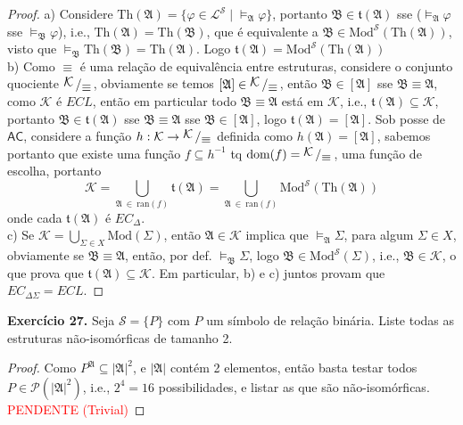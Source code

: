 \documentclass[11pt]{article}
\newcommand{\mc}[1]{\mathcal{#1}}
\newcommand{\mf}[1]{\mathfrak{#1}}
\newcommand{\msf}[1]{\mathsf{#1}}
\newcommand{\bigslant}[2]{{\raisebox{.2em}{$#1$}\left/\raisebox{-.2em}{$#2$}\right.}}
\begin{document}
\begin{proof}
    a) Considere $\text{Th}(\mf{A})=\{\varphi\in\mc{L}^\mc{S}\mid\vDash_\mf{A}\varphi\}$, portanto $\mf{B}\in\mf{t}(\mf{A})$ sse ($\vDash_\mf{A}\varphi$ sse $\vDash_\mf{B}\varphi$), i.e., $\text{Th}(\mf{A})=\text{Th}(\mf{B})$, que é equivalente a $\mf{B}\in\text{Mod}^\mc{S}\left(\text{Th}(\mf{A})\right)$, visto que $\vDash_\mf{B}\text{Th}(\mf{B})=\text{Th}(\mf{A})$. Logo $\mf{t}(\mf{A})=\text{Mod}^\mc{S}\left(\text{Th}(\mf{A})\right)$\\
    b) Como $\equiv$ é uma relação de equivalência entre estruturas, considere o conjunto quociente $\bigslant{\mc{K}}{\equiv}$, obviamente se temos $[\mf{A}]\in\bigslant{\mc{K}}{\equiv}$, então $\mf{B}\in[\mf{A}]$ sse $\mf{B}\equiv\mf{A}$, como $\mc{K}$ é $ECL$, então em particular todo $\mf{B}\equiv\mf{A}$ está em $\mc{K}$, i.e., $\mf{t}(\mf{A})\subseteq\mc{K}$, portanto $\mf{B}\in\mf{t}(\mf{A})$ sse $\mf{B}\equiv\mf{A}$ sse $\mf{B}\in[\mf{A}]$, logo $\mf{t}(\mf{A})=[\mf{A}]$. Sob posse de $\msf{AC}$, considere a função $h:\mc{K}\to\bigslant{\mc{K}}{\equiv}$ definida como $h(\mf{A})=[\mf{A}]$, sabemos portanto que existe uma função $f\subseteq h^{-1}$ tq $\text{dom}(f)=\bigslant{\mc{K}}{\equiv}$, uma função de escolha, portanto
    $$\mc{K}=\bigcup_{\mf{A}~\in~\text{ran}(f)}\mf{t}(\mf{A})=\bigcup_{\mf{A}~\in~\text{ran}(f)}\text{Mod}^\mc{S}\left(\text{Th}(\mf{A})\right)$$
    onde cada $\mf{t}(\mf{A})$ é $EC_\Delta$.\\
    c) Se $\mc{K}=\bigcup_{\Sigma\in X}\text{Mod}(\Sigma)$, então $\mf{A}\in\mc{K}$ implica que $\vDash_\mf{A}\Sigma$, para algum $\Sigma\in X$, obviamente se $\mf{B}\equiv\mf{A}$, então, por def. $\vDash_\mf{B}\Sigma$, logo $\mf{B}\in\text{Mod}^\mc{S}(\Sigma)$, i.e., $\mf{B}\in\mc{K}$, o que prova que $\mf{t}(\mf{A})\subseteq\mc{K}$. Em particular, b) e c) juntos provam que $EC_{\Delta\Sigma}=ECL$.
\end{proof}

\begin{shaded}
\textbf{Exercício 27.} Seja $\mc{S}=\{P\}$ com $P$ um símbolo de relação binária. Liste todas as estruturas não-isomórficas de tamanho 2.
\end{shaded}

\begin{proof}
    Como $P^\mf{A}\subseteq|\mf{A}|^2$, e $|\mf{A}|$ contém 2 elementos, então basta testar todos $P\in\mathcal{P}(|\mf{A}|^2)$, i.e., $2^4=16$ possibilidades, e listar as que são não-isomórficas.\\
    \textcolor{red}{PENDENTE (Trivial)}
\end{proof}
\end{document}
